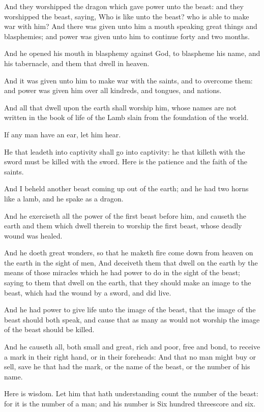 \verse And they worshipped the dragon which gave power unto the beast: and they worshipped the beast, saying, Who is like unto the beast? who is able to make war with him?  \verse And there was given unto him a mouth speaking great things and blasphemies; and power was given unto him to continue forty and two months.

\verse And he opened his mouth in blasphemy against God, to blaspheme his name, and his tabernacle, and them that dwell in heaven.

\verse And it was given unto him to make war with the saints, and to overcome them: and power was given him over all kindreds, and tongues, and nations.

\verse And all that dwell upon the earth shall worship him, whose names are not written in the book of life of the Lamb slain from the foundation of the world.

\verse If any man have an ear, let him hear.

\verse He that leadeth into captivity shall go into captivity: he that killeth with the sword must be killed with the sword. Here is the patience and the faith of the saints.

\verse And I beheld another beast coming up out of the earth; and he had two horns like a lamb, and he spake as a dragon.

\verse And he exerciseth all the power of the first beast before him, and causeth the earth and them which dwell therein to worship the first beast, whose deadly wound was healed.

\verse And he doeth great wonders, so that he maketh fire come down from heaven on the earth in the sight of men, \verse And deceiveth them that dwell on the earth by the means of those miracles which he had power to do in the sight of the beast; saying to them that dwell on the earth, that they should make an image to the beast, which had the wound by a sword, and did live.

\verse And he had power to give life unto the image of the beast, that the image of the beast should both speak, and cause that as many as would not worship the image of the beast should be killed.

\verse And he causeth all, both small and great, rich and poor, free and bond, to receive a mark in their right hand, or in their foreheads: \verse And that no man might buy or sell, save he that had the mark, or the name of the beast, or the number of his name.

\verse Here is wisdom. Let him that hath understanding count the number of the beast: for it is the number of a man; and his number is Six hundred threescore and six.


